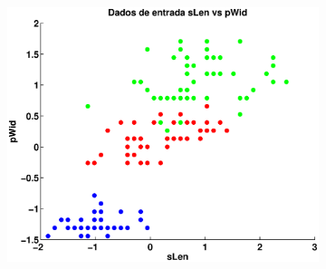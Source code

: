 \documentclass[12pt,journal,onecolumn]{IEEEtran}
\begin{document}
\begin{figure}[h]
\begin{subfigure}[h]{0.3\textwidth}
	\end{subfigure} 
	\begin{subfigure}[h]{0.3\textwidth}
		\includegraphics[width=\textwidth]{eps/3classes/input/sLen-vs-pWid.eps}
	\end{subfigure} 
	

\end{figure}
\end{document}
